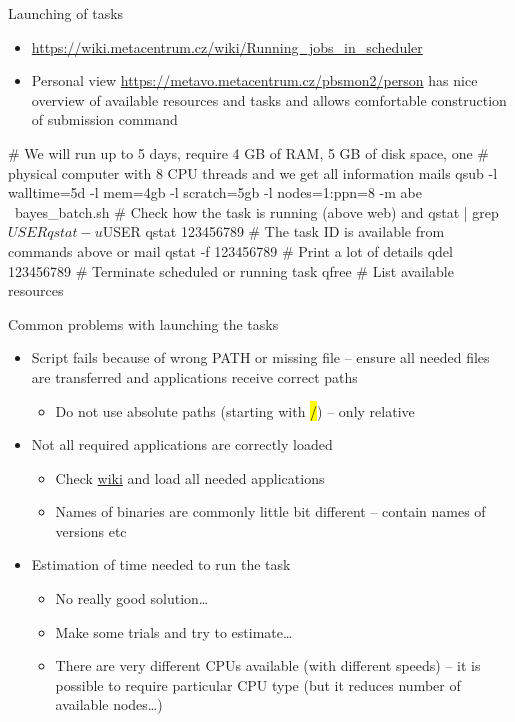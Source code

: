 \documentclass[compress, ucs, xelatex, 11pt, xcolor=svgnames,
  hyperref={
    bookmarks=true,
    unicode=true,
    colorlinks=true,
    pdftitle={Linux, command line and MetaCentrum},
    plainpages=false,
    pdfauthor={Vojtech Zeisek},
    pdfsubject={Course about use of Linux command line, writing shell scripts and using MetaCentrum of CESNET},
    pdfcreator={XeLaTeX},
    pdfkeywords={Linux, GNU, BASH, shell, command line, MetaCentrum},
    linkcolor=Red,
    anchorcolor=Blue,
    citecolor=Purple,
    filecolor=DodgerBlue,
    menucolor=DarkOrchid,
    urlcolor=DeepSkyBlue,
    pdftex},
  url={hyphens, lowtilde} %
  ]{beamer}
\renewcommand{\texttt}[1]{\hl{\ttfamily #1}}
\begin{document}
\begin{frame}[fragile]{Launching of tasks}
\begin{itemize}
  \item \url{https://wiki.metacentrum.cz/wiki/Running_jobs_in_scheduler}
  \item Personal view \url{https://metavo.metacentrum.cz/pbsmon2/person} has nice overview of available resources and tasks and allows comfortable construction of submission command
\end{itemize}
  \begin{bashcode}
    # We will run up to 5 days, require 4 GB of RAM, 5 GB of disk space, one
    # physical computer with 8 CPU threads and we get all information mails
    qsub -l walltime=5d -l mem=4gb -l scratch=5gb -l nodes=1:ppn=8 -m abe \
      bayes_batch.sh
    # Check how the task is running (above web) and
    qstat | grep $USER
    qstat -u $USER
    qstat 123456789 # The task ID is available from commands above or mail
    qstat -f 123456789 # Print a lot of details
    qdel 123456789 # Terminate scheduled or running task
    qfree # List available resources
  \end{bashcode}
\end{frame}

\begin{frame}{Common problems with launching the tasks}
  \begin{itemize}
    \item Script fails because of wrong PATH or missing file -- ensure all needed files are transferred and applications receive correct paths
    \begin{itemize}
      \item Do not use absolute paths (starting with \texttt{/}) -- only relative
    \end{itemize}
    \item Not all required applications are correctly loaded
    \begin{itemize}
      \item Check \href{https://wiki.metacentrum.cz/wiki/Kategorie:Applications}{wiki} and load all needed applications
      \item Names of binaries are commonly little bit different -- contain names of versions etc
    \end{itemize}
    \item Estimation of time needed to run the task
    \begin{itemize}
      \item No really good solution\ldots
      \item Make some trials and try to estimate\ldots
      \item There are very different CPUs available (with different speeds) -- it is possible to require particular CPU type (but it reduces number of available nodes\ldots)
    \end{itemize}
  \end{itemize}
\end{frame}
\end{document}
